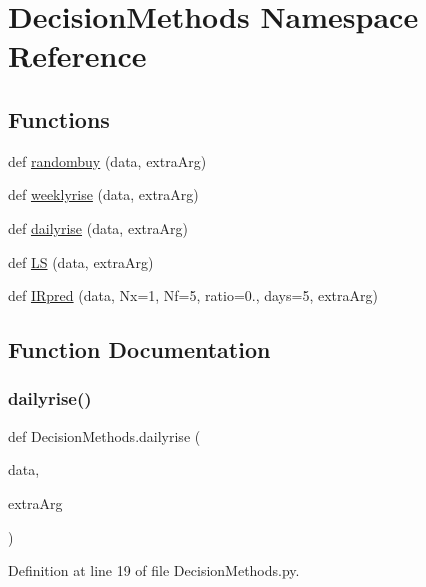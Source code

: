 \hypertarget{namespaceDecisionMethods}{}\section{Decision\+Methods Namespace Reference}
\label{namespaceDecisionMethods}
\subsection*{Functions}
\begin{DoxyCompactItemize}
\item 
def \hyperlink{namespaceDecisionMethods_a44bd5be577a4d99d6b2d144ad405dd09}{randombuy} (data, extra\+Arg)
\item 
def \hyperlink{namespaceDecisionMethods_aed1379cd4db8a24d6e5e45908a88cb4b}{weeklyrise} (data, extra\+Arg)
\item 
def \hyperlink{namespaceDecisionMethods_a4cb76bf4e82cc2509499af66f8c816b3}{dailyrise} (data, extra\+Arg)
\item 
def \hyperlink{namespaceDecisionMethods_a856437b184fc8efd2df5f7fe1ba3644d}{LS} (data, extra\+Arg)
\item 
def \hyperlink{namespaceDecisionMethods_a6ee6e338ea6a22bd13d5b9767b126f83}{I\+Rpred} (data, Nx=1, Nf=5, ratio=0., days=5, extra\+Arg)
\end{DoxyCompactItemize}


\subsection{Function Documentation}
\hypertarget{namespaceDecisionMethods_a4cb76bf4e82cc2509499af66f8c816b3}{}\label{namespaceDecisionMethods_a4cb76bf4e82cc2509499af66f8c816b3} 
\subsubsection{\texorpdfstring{dailyrise()}{dailyrise()}}
{\footnotesize\ttfamily def Decision\+Methods.\+dailyrise (\begin{DoxyParamCaption}\item[{}]{data,  }\item[{}]{extra\+Arg }\end{DoxyParamCaption})}



Definition at line 19 of file Decision\+Methods.\+py.



